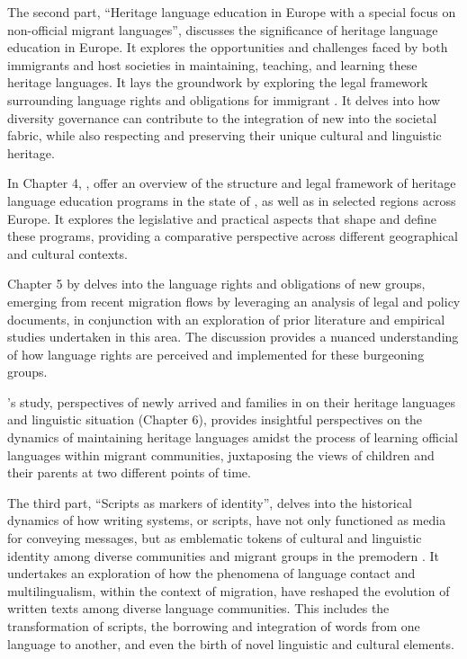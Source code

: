\documentclass[output=paper,colorlinks,citecolor=brown]{langscibook}
\begin{document}
The second part, ``Heritage language education in Europe with a special focus on non-official migrant languages'', discusses the significance of heritage language education in Europe. It explores the opportunities and challenges faced by both immigrants and host societies in maintaining, teaching, and learning these heritage languages. It lays the groundwork by exploring the legal framework surrounding language rights and obligations for immigrant . It delves into how diversity governance can contribute to the integration of new  into the societal fabric, while also respecting and preserving their unique cultural and linguistic heritage.

In Chapter 4, , \citeauthor*{chapters/2.3_IFLMD_Hofmann}
offer an overview of the structure and legal framework of heritage language education programs in the  state of , as well as in selected regions across Europe. It explores the legislative and practical aspects that shape and define these programs, providing a comparative perspective across different geographical and cultural contexts. 

Chapter 5 by \citeauthor*{chapters/2.4_IFLMD_Medda-Windischer} 
delves into the language rights and obligations of new  groups, emerging from recent migration flows by leveraging an analysis of legal and policy documents, in conjunction with an exploration of prior literature and empirical studies undertaken in this area. The discussion provides a nuanced understanding of how language rights are perceived and implemented for these burgeoning  groups.

\citeauthor*{chapters/2.5_IFLMD_Koca}'s study,  perspectives of newly arrived  and  families in  on their heritage languages and linguistic situation (Chapter 6), provides insightful perspectives on the dynamics of maintaining heritage languages amidst the process of learning official languages within migrant communities, juxtaposing the views of children and their parents at two different points of time.

The third part, ``Scripts as markers of identity'', delves into the historical dynamics of how writing systems, or scripts, have not only functioned as media for conveying messages, but as emblematic tokens of cultural and linguistic identity among diverse communities and migrant groups in the premodern . It undertakes an exploration of how the phenomena of language contact and multilingualism, within the context of migration, have reshaped the evolution of written texts among diverse language communities. This includes the transformation of scripts, the borrowing and integration of words from one language to another, and even the birth of novel linguistic and cultural elements.
\end{document}
